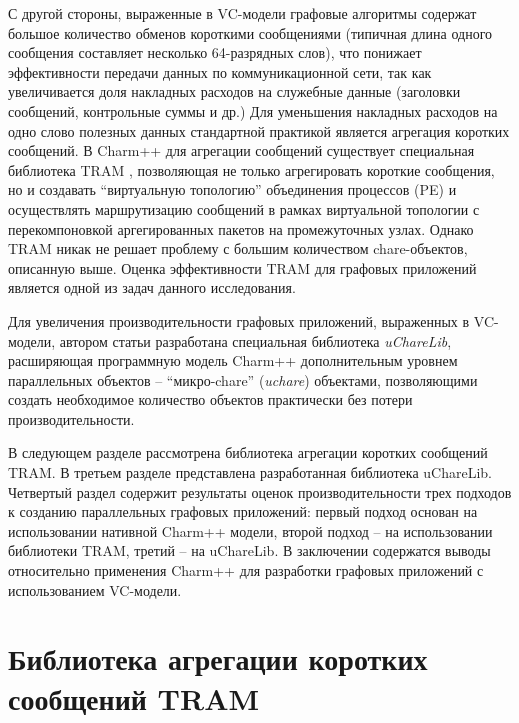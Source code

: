 \documentclass[11pt, oneside, a4paper]{article}
\newcommand\todo[1]{\textcolor{red}{\tiny ToDo: #1}}
\begin{document}
С другой стороны, выраженные в VC-модели графовые алгоритмы содержат большое количество обменов короткими 
сообщениями (типичная длина одного сообщения составляет несколько 64-разрядных слов), что понижает эффективности передачи 
данных по коммуникационной 
сети, так как увеличивается доля накладных расходов на служебные данные (заголовки сообщений, контрольные суммы и др.)
Для уменьшения накладных расходов на одно слово полезных данных стандартной практикой является агрегация коротких сообщений.
В Charm++ для агрегации сообщений существует специальная библиотека TRAM \cite{tramICPP14}, позволяющая не только агрегировать
короткие сообщения, но и создавать ``виртуальную топологию'' объединения процессов (PE) и осуществлять маршрутизацию сообщений 
в рамках виртуальной топологии с перекомпоновкой аргегированных пакетов на промежуточных узлах. Однако TRAM никак не решает проблему с 
большим количеством chare-объектов, описанную выше. Оценка эффективности TRAM для графовых
приложений является одной из задач данного исследования.

% 
Для увеличения производительности графовых приложений, выраженных в VC-модели, автором статьи разработана
специальная библиотека \textit{uChareLib}, расширяющая программную модель Charm++ дополнительным уровнем параллельных 
объектов -- ``микро-chare'' (\textit{uchare}) объектами, позволяющими создать необходимое количество объектов практически без
потери производительности.

В следующем разделе рассмотрена библиотека агрегации коротких сообщений TRAM. В третьем разделе представлена разработанная библиотека
uChareLib. Четвертый раздел содержит результаты оценок производительности трех подходов к созданию параллельных графовых приложений:
первый подход основан на использовании нативной Charm++ модели, второй подход -- на использовании библиотеки TRAM, третий -- на uChareLib.
В заключении содержатся выводы относительно применения Charm++ для разработки графовых приложений с использованием VC-модели.


\section{Библиотека агрегации коротких сообщений TRAM}
\end{document}
